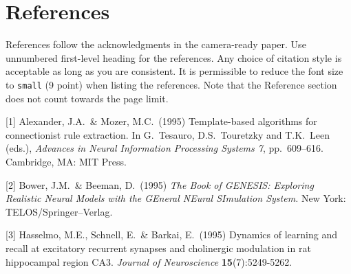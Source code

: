 \documentclass{article}
\begin{document}




\section*{References}


References follow the acknowledgments in the camera-ready paper. Use unnumbered first-level heading for
the references. Any choice of citation style is acceptable as long as you are
consistent. It is permissible to reduce the font size to \verb+small+ (9 point)
when listing the references.
Note that the Reference section does not count towards the page limit.
\medskip


{
\small


[1] Alexander, J.A.\ \& Mozer, M.C.\ (1995) Template-based algorithms for
connectionist rule extraction. In G.\ Tesauro, D.S.\ Touretzky and T.K.\ Leen
(eds.), {\it Advances in Neural Information Processing Systems 7},
pp.\ 609--616. Cambridge, MA: MIT Press.


[2] Bower, J.M.\ \& Beeman, D.\ (1995) {\it The Book of GENESIS: Exploring
  Realistic Neural Models with the GEneral NEural SImulation System.}  New York:
TELOS/Springer--Verlag.


[3] Hasselmo, M.E., Schnell, E.\ \& Barkai, E.\ (1995) Dynamics of learning and
recall at excitatory recurrent synapses and cholinergic modulation in rat
hippocampal region CA3. {\it Journal of Neuroscience} {\bf 15}(7):5249-5262.
}


\end{document}
